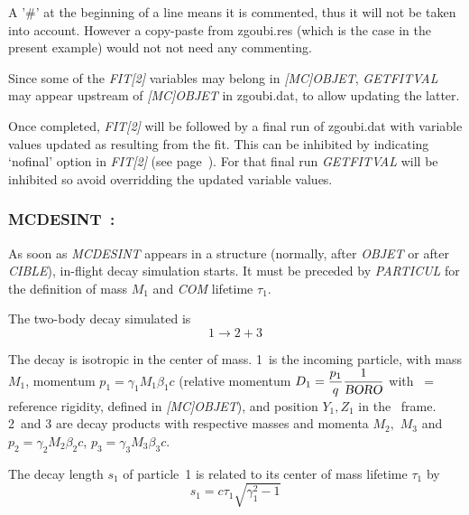 {\noindent A '\#' at the beginning of a line means it is commented, thus it will not be taken into account. 
However a copy-paste from zgoubi.res (which is the case in the present example) would not not need any commenting. 

\medskip

\noindent Since some of the \textsl{FIT[2]} variables may belong in \textsl{[MC]OBJET}, \textsl{GETFITVAL} may appear 
upstream of  \textsl{[MC]OBJET} in zgoubi.dat, to allow updating the latter. 

\medskip

\noindent Once completed, \textsl{FIT[2]} will be followed by a final  
run of zgoubi.dat with variable values updated as resulting from the fit. 
This can be inhibited by indicating `nofinal' option  
 in \textsl{FIT[2]} (see page~\pageref{nofinal}). 
For that final run 
\textsl{GETFITVAL} will be inhibited so avoid overridding the updated variable values. 


\newpage

\subsubsection{MCDESINT~: \MCDESINTTitl \protect\cite{Biblio11}}
\medskip 
\label{MCDESINT}

 As soon as \textsl{MCDESINT}  appears in a structure
(normally, after \textsl{OBJET} or after \textsl{CIBLE}),
 in-flight decay simulation starts. 
It must be preceded by \textsl{PARTICUL} for the definition of mass $ M_1 $ 
and \textsl{COM} 
lifetime $\tau_1$. 

\noindent The two-body decay simulated is 
 $$ 1 \longrightarrow  2+3 $$

\noindent The decay is isotropic in the center of mass. 
1~is the incoming particle, with mass $ M_1 $, momentum $ p_1=\gamma_1 M_1\beta_ 1c $ (relative 
momentum $ D_1= \dfrac{p_1 }{ q} \dfrac{1 }{\textsl{BORO}} $ with \BORO\   = reference
rigidity, defined in \textsl{[MC]OBJET}),  and position $ Y_1,Z_1 $ in the \zgou\ frame. 
2~and 3 are decay products with respective masses and momenta $ M_2, $ $ M_3 $ and 
$ p_2=\gamma_ 2M_2\beta_2c$,  $ p_3=\gamma_ 3M_3\beta_ 3c$.  

\noindent The decay length  $ s_1 $ of particle~1 is related to its center of 
mass lifetime $ \tau_ 1 $ by 
$$ s_1=c\tau_ 1 \sqrt{ \gamma^ 2_1 -1} $$

}
